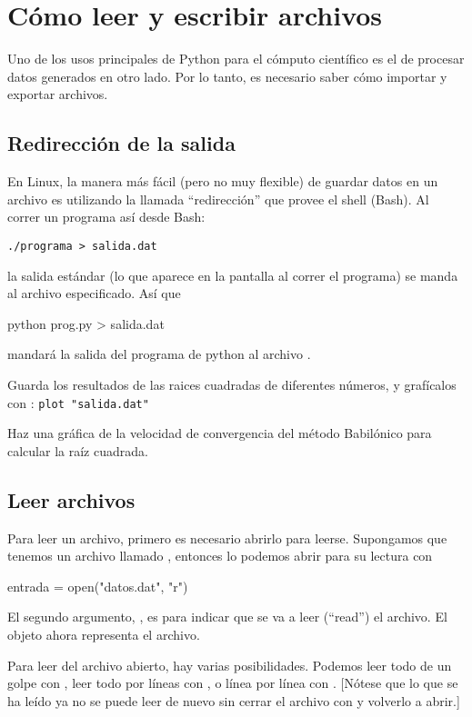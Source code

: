 \chapter{Cómo leer y escribir archivos}
Uno de los usos principales de Python para el cómputo científico es el de procesar datos generados en otro lado.
Por lo tanto, es necesario saber cómo importar y exportar archivos.




\section{Redirección de la salida}
En Linux, la manera más fácil (pero no muy flexible) de guardar datos en un archivo es utilizando la llamada ``redirección'' que provee el shell (Bash). Al correr un programa así desde Bash:
\begin{verbatim}
./programa > salida.dat
\end{verbatim}
la salida estándar (lo que aparece en la pantalla al correr el programa) se manda al archivo especificado. 
Así que
\begin{python}
python prog.py > salida.dat
\end{python}
mandará la salida del programa de python  al archivo .

\ej Guarda los resultados de las raices cuadradas de diferentes números, y grafícalos con :
\texttt{plot "salida.dat"}

\ej Haz una gráfica de la velocidad de convergencia del método Babilónico para calcular la raíz cuadrada.

\section{Leer archivos}
Para leer un archivo, primero es necesario abrirlo para leerse. Supongamos que tenemos un archivo llamado , entonces lo podemos abrir para su lectura con
\begin{python}
entrada = open("datos.dat", "r")
\end{python}
El segundo argumento, , es para indicar que se va a leer  (``read'') el archivo.
El objeto  ahora representa el archivo.

Para leer del archivo abierto, hay varias posibilidades. Podemos leer todo de un golpe con , leer todo por líneas con , o línea por línea con . [Nótese que lo que se ha leído ya no se puede leer de nuevo sin cerrar el archivo con  y volverlo a abrir.]

